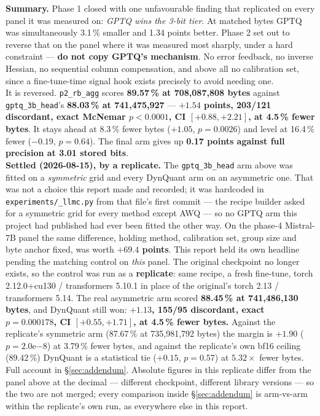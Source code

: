 \documentclass[11pt]{article}
\newcommand{\pct}{\,\%}
\newcommand{\code}[1]{\texttt{#1}}
\begin{document}
\begin{titlepage}
\begin{minipage}{0.86\textwidth}
\small
\textbf{Summary.} Phase 1 closed with one unfavourable finding that replicated on every panel it
was measured on: \emph{GPTQ wins the 3-bit tier}. At matched bytes GPTQ was simultaneously
3.1\pct{} smaller and 1.34 points better. Phase 2 set out to reverse that on the panel where it
was measured most sharply, under a hard constraint --- \textbf{do not copy GPTQ's mechanism}. No
error feedback, no inverse Hessian, no sequential column compensation, and above all no
calibration set, since a fine-tune-time signal hook exists precisely to avoid needing one.
\\[0.7em]
It is reversed. \code{p2\_rb\_agg} scores \textbf{89.57\pct{} at 708{,}087{,}808 bytes} against
\code{gptq\_3b\_head}'s \textbf{88.03\pct{} at 741{,}475{,}927} --- \textbf{$+1.54$ points,
203/121 discordant, exact McNemar $p < 0.0001$, CI $[+0.88, +2.21]$, at 4.5\pct{} fewer bytes}.
It stays ahead at 8.3\pct{} fewer bytes ($+1.05$, $p = 0.0026$) and level at 16.4\pct{} fewer
($-0.19$, $p = 0.64$). The final arm gives up \textbf{0.17 points against full precision at 3.01
stored bits}.
\\[0.7em]
\textbf{Settled (2026-08-15), by a replicate.} The \code{gptq\_3b\_head} arm above was fitted on
a \emph{symmetric} grid and every DynQuant arm on an asymmetric one. That was not a choice this
report made and recorded; it was hardcoded in \code{experiments/\_llmc.py} from that file's first
commit --- the recipe builder asked for a symmetric grid for every method except AWQ --- so no
GPTQ arm this project had published had ever been fitted the other way. On the phase-4
Mistral-7B panel the same difference, holding method, calibration set, group size and byte
anchor fixed, was worth \textbf{$+69.4$ points}. This report held its own headline pending the
matching control on \emph{this} panel. The original checkpoint no longer exists, so the control
was run as a \textbf{replicate}: same recipe, a fresh fine-tune, torch 2.12.0+cu130 /
transformers 5.10.1 in place of the original's torch 2.13 / transformers 5.14. The real
asymmetric arm scored \textbf{88.45\pct{} at 741{,}486{,}130 bytes}, and DynQuant still won:
\textbf{$+1.13$, 155/95 discordant, exact $p = 0.000178$, CI $[+0.55, +1.71]$, at 4.5\pct{} fewer
bytes.} Against the replicate's symmetric arm (87.67\pct{} at 735{,}981{,}792 bytes) the margin is
$+1.90$ ($p = 2.0\mathrm{e}{-8}$) at 3.79\pct{} fewer bytes, and against the replicate's own bf16
ceiling (89.42\pct{}) DynQuant is a statistical tie ($+0.15$, $p = 0.57$) at $5.32\times$ fewer
bytes. Full account in \S\ref{sec:addendum}. Absolute figures in this replicate differ from the
panel above at the decimal --- different checkpoint, different library versions --- so the two
are not merged; every comparison inside \S\ref{sec:addendum} is arm-vs-arm within the replicate's
own run, as everywhere else in this report.


\end{minipage}
\end{titlepage}
\end{document}
